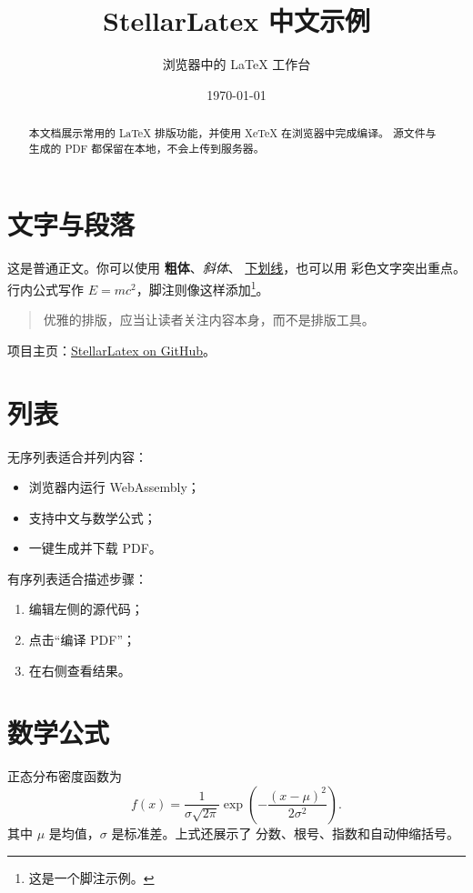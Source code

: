 \documentclass[UTF8,11pt]{ctexart}
\title{StellarLatex 中文示例}
\author{浏览器中的 \LaTeX{} 工作台}
\date{\today}
\begin{document}
\maketitle

\begin{abstract}
本文档展示常用的 \LaTeX{} 排版功能，并使用 XeTeX 在浏览器中完成编译。
源文件与生成的 PDF 都保留在本地，不会上传到服务器。
\end{abstract}

\section{文字与段落}

这是普通正文。你可以使用 \textbf{粗体}、\textit{斜体}、
\underline{下划线}，也可以用 \textcolor{stellarblue}{彩色文字}突出重点。
行内公式写作 $E=mc^2$，脚注则像这样添加\footnote{这是一个脚注示例。}。

\begin{quote}
优雅的排版，应当让读者关注内容本身，而不是排版工具。
\end{quote}

项目主页：\href{https://github.com/Arxtect/StellarLatex}{StellarLatex on GitHub}。

\section{列表}

无序列表适合并列内容：
\begin{itemize}
  \item 浏览器内运行 WebAssembly；
  \item 支持中文与数学公式；
  \item 一键生成并下载 PDF。
\end{itemize}

有序列表适合描述步骤：
\begin{enumerate}
  \item 编辑左侧的源代码；
  \item 点击“编译 PDF”；
  \item 在右侧查看结果。
\end{enumerate}

\section{数学公式}

正态分布密度函数为
\begin{equation*}
  f(x)=\frac{1}{\sigma\sqrt{2\pi}}
  \exp\left(-\frac{(x-\mu)^2}{2\sigma^2}\right).
\end{equation*}
其中 $\mu$ 是均值，$\sigma$ 是标准差。上式还展示了
分数、根号、指数和自动伸缩括号。
\end{document}
